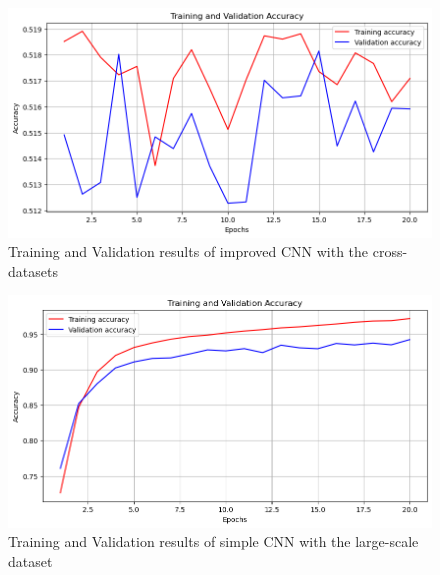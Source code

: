 \documentclass[rebuttal]{cvpr}
\begin{document}
\begin{itemize}
   \begin{figure}[t]
      \centering
      \includegraphics[width=0.9\linewidth]{images/ex-cd-improvedcnn-accuracy-results.png}
      \caption{Training and Validation results of improved CNN with the cross-datasets}
      \label{fig:ex-cd-improvedcnn-results}
   \end{figure}

       \begin{figure}[t]
          \centering
          \includegraphics[width=0.9\linewidth]{images/ex-d2-simplecnn-accuracy-results.png}
          \caption{Training and Validation results of simple CNN with the large-scale dataset}
          \label{fig:ex-d2-simplecnn-results}
       \end{figure}
       

\end{itemize}
\end{document}
